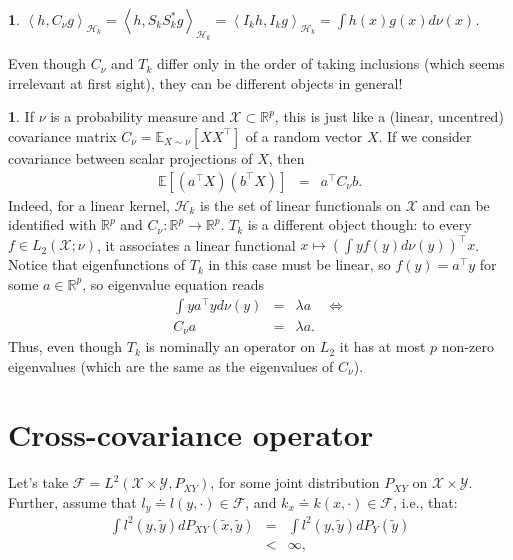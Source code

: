 \documentclass[english]{article}
\theoremstyle{definition}
\theoremstyle{plain}
\newtheorem{fact}{\protect\factname}
\theoremstyle{definition}
\newtheorem{example}{\protect\examplename}
\providecommand{\examplename}{Example}
\providecommand{\factname}{Fact}
\begin{document}
\begin{fact}
$\left\langle h,C_{\nu}g\right\rangle _{\mathcal{H}_{k}}=\left\langle h,S_{k}S_{k}^{*}g\right\rangle _{\mathcal{H}_{k}}=\left\langle I_{k}h,I_{k}g\right\rangle _{\mathcal{H}_{k}}=\int h(x)g(x)d\nu(x)$.
\end{fact}
Even though $C_{\nu}$ and $T_{k}$ differ only in the order of taking
inclusions (which seems irrelevant at first sight), they can be different
objects in general!
\begin{example}
If $\nu$ is a probability measure and $\mathcal{X}\subset\mathbb{R}^{p}$,
this is just like a (linear, uncentred) covariance matrix $C_{\nu}=\mathbb{E}_{X\sim\nu}\left[XX^{\top}\right]$
of a random vector $X$. If we consider covariance between scalar
projections of $X$, then 
\begin{eqnarray*}
\mathbb{E}\left[\left(a^{\top}X\right)\left(b^{\top}X\right)\right] & = & a^{\top}C_{\nu}b.
\end{eqnarray*}
Indeed, for a linear kernel, $\mathcal{H}_{k}$ is the set of linear
functionals on $\mathcal{X}$ and can be identified with $\mathbb{R}^{p}$
and $C_{\nu}:\mathbb{R}^{p}\to\mathbb{R}^{p}$. $T_{k}$ is a different
object though: to every $f\in L_{2}(\mathcal{X};\nu)$, it associates
a linear functional $x\mapsto\left(\int yf(y)d\nu(y)\right)^{\top}x$.
Notice that eigenfunctions of $T_{k}$ in this case must be linear,
so $f(y)=a^{\top}y$ for some $a\in\mathbb{R}^{p}$, so eigenvalue
equation reads
\begin{eqnarray*}
\int ya^{\top}yd\nu(y) & = & \lambda a\quad\Leftrightarrow\\
C_{\nu}a & = & \lambda a.
\end{eqnarray*}
Thus, even though $T_{k}$ is nominally an operator on $L_{2}$ it
has at most $p$ non-zero eigenvalues (which are the same as the eigenvalues
of $C_{\nu}$).
\end{example}

\section{Cross-covariance operator}

Let's take $\mathcal{F}=L^{2}(\mathcal{X}\times\mathcal{Y},P_{XY})$,
for some joint distribution $P_{XY}$ on $\mathcal{X}\times\mathcal{Y}$.
Further, assume that $l_{y}\doteq l(y,\cdot)\in\mathcal{F}$, and
$k_{x}\doteq k(x,\cdot)\in\mathcal{F}$, i.e., that:
\begin{eqnarray*}
\int l^{2}(y,\tilde{y})dP_{XY}(\tilde{x},\tilde{y}) & = & \int l^{2}(y,\tilde{y})dP_{Y}(\tilde{y})\\
 & < & \infty,
\end{eqnarray*}
\end{document}
